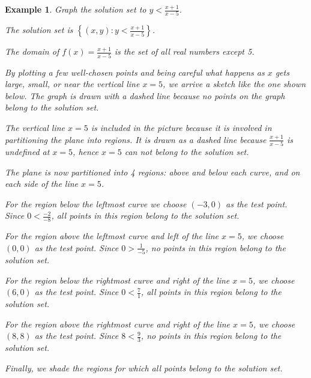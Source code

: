 \documentclass[11pt]{book}               %
\newtheorem{example}{Example}
\begin{document}
\begin{example}
Graph the solution set to $y < \frac{x+1}{x-5}$.
\normalfont

The solution set is $\left\{(x,y): y < \frac{x+1}{x-5}\right\}$.

The domain of $f(x) = \frac{x+1}{x-5}$ is the set of all real numbers except 5.

By plotting a few well-chosen points and being careful what happens as $x$ gets large, small, or near the vertical line $x = 5$, we arrive a sketch like the one shown below.  The graph is drawn with a dashed line because no
points on the graph belong to the solution set.

The vertical line $x = 5$ is included in the picture because it is involved in partitioning the plane into regions.  It is drawn as a dashed line because 
$\frac{x+1}{x-5}$ is undefined at $x=5$, hence $x = 5$ can not belong to the solution set.

\begin{center}
\end{center}

The plane is now partitioned into 4 regions: above and below each curve, and on each side of the line $x = 5$.

For the region below the leftmost curve we choose $(-3, 0)$ as the test point.
Since $0 < \frac{-2}{-8}$, all points in this region belong to the solution set.

For the region above the leftmost curve and left of the line $x = 5$, we choose $(0, 0)$ as the test point.
Since $0 > \frac{1}{-5}$, no  points in this region belong to the solution set.

For the region below the rightmost curve and right of the line $x = 5$, we choose $(6, 0)$ as the test point.
Since $ 0 < \frac{7}{1}$, all points in this region belong to the solution set.

For the region above the rightmost curve and right of the line $x = 5$, we choose $(8, 8)$ as the test point.
Since $8 < \frac{9}{3}$, no  points in this region belong to the solution set.

Finally, we shade the regions for which all points belong to the solution set.



\end{example}
\end{document}
